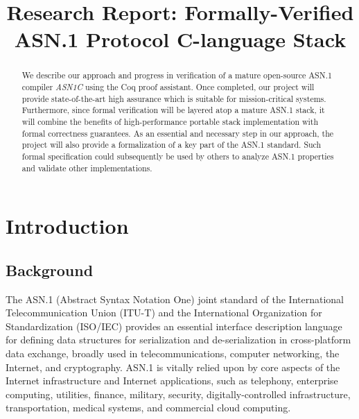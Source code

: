 \documentclass[10p,conference]{IEEEtran}
\begin{document}
\title{Research Report: Formally-Verified ASN.1 Protocol C-language Stack}

\author{
\and
{}
}

\maketitle

\begin{abstract}

  We describe our approach and progress in verification of a
  mature open-source ASN.1 compiler \emph{ASN1C} using the Coq proof
  assistant. Once completed, our project will provide state-of-the-art
  high assurance which is suitable for mission-critical systems. Furthermore, since
  formal verification will be layered atop a mature ASN.1
  stack, it will combine the benefits of high-performance portable
  stack implementation with formal correctness guarantees. As an essential and necessary step in our
  approach, the project will also provide a formalization of a key part of
  the ASN.1 standard. Such formal specification could subsequently be
  used by others to analyze ASN.1 properties and validate other
  implementations.
\end{abstract}

\section{Introduction}

\subsection{Background}

The ASN.1 (Abstract Syntax
Notation One) \cite{ASN1Intro} joint standard of the International
Telecommunication Union (ITU-T) and the International Organization for
Standardization (ISO/IEC) provides an essential interface description
language for defining data structures for serialization and
de-serialization in cross-platform data exchange, broadly used in
telecommunications, computer networking, the Internet, and
cryptography. ASN.1 is vitally relied upon by core aspects of the
Internet infrastructure and Internet applications, such as telephony,
enterprise computing, utilities, finance, military, security,
digitally-controlled infrastructure, transportation, medical systems,
and commercial cloud computing.
\end{document}
